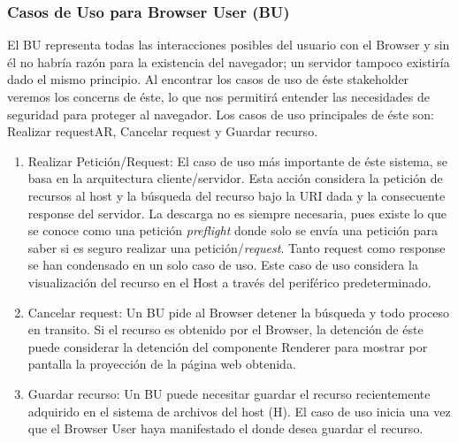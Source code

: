 \subsubsection{Casos de Uso para Browser User (BU)}
		El BU representa todas las interacciones posibles del usuario con el Browser y sin él no habría razón para la existencia del navegador; un servidor tampoco existiría dado el mismo principio. Al encontrar los casos de uso de éste stakeholder veremos los concerns de éste, lo que nos permitirá entender las necesidades de seguridad para proteger al navegador. Los casos de uso principales de éste son: Realizar requestAR, Cancelar request y Guardar recurso.
			\begin{enumerate}	
				\item Realizar Petición/Request: El caso de uso más importante de éste sistema, se basa en la arquitectura cliente/servidor. Esta acción considera la petición de recursos al host y la búsqueda del recurso bajo la URI dada y la consecuente response del servidor. La descarga no es siempre necesaria, pues existe lo que se conoce como una petición \textit{preflight} donde solo se envía una petición para saber si es seguro realizar una petición/\textit{request}. Tanto request como response se han condensado en un solo caso de uso. Este caso de uso considera la visualización del recurso en el Host a través del periférico predeterminado.
				\item Cancelar request: Un BU pide al Browser detener la búsqueda y todo proceso en transito. Si el recurso es obtenido por el Browser, la detención de éste puede considerar la detención del componente Renderer para mostrar por pantalla la proyección de la página web obtenida.			
				\item Guardar recurso: Un BU puede necesitar guardar el recurso recientemente adquirido en el sistema de archivos del host (H). El caso de uso inicia una vez que el Browser User haya manifestado el donde desea guardar el recurso.
			\end{enumerate}

